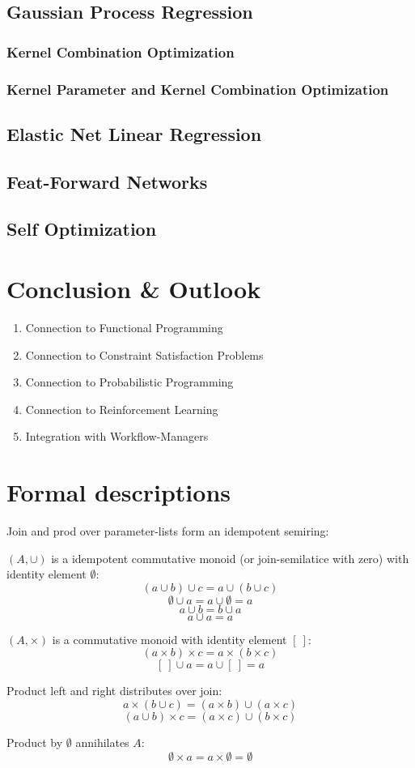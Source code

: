 \documentclass[english]{article}
\begin{document}
\subsection{Gaussian Process Regression}
\subsubsection{Kernel Combination Optimization}
\subsubsection{Kernel Parameter and Kernel Combination Optimization}
\subsection{Elastic Net Linear Regression}
\subsection{Feat-Forward Networks}
\subsection{Self Optimization}

\section{Conclusion \& Outlook}

\begin{enumerate}
  \item{Connection to Functional Programming}
  \item{Connection to Constraint Satisfaction Problems}
  \item{Connection to Probabilistic Programming}
  \item{Connection to Reinforcement Learning}
  \item{Integration with Workflow-Managers}
\end{enumerate}



\appendix



\section*{Formal descriptions}
Join and prod over parameter-lists form an idempotent semiring:

$(A, \cup)$ is a idempotent commutative monoid (or join-semilatice with zero) with identity element $\emptyset$:
$$(a \cup b) \cup c = a \cup (b \cup c)$$
$$\emptyset \cup a = a \cup \emptyset = a$$
$$a \cup b = b \cup a$$
$$a \cup a = a$$

$(A, \times)$ is a commutative monoid with identity element $[\ ]$:
$$(a \times b) \times c = a \times (b \times c)$$
$$[\ ] \cup a = a \cup [\ ] = a$$

Product left and right distributes over join:
$$a\times(b \cup c) = (a\times b) \cup (a\times c)$$
$$(a \cup b)\times c = (a\times c) \cup (b\times c)$$

Product by $\emptyset$ annihilates $A$:
$$\emptyset \times a = a \times \emptyset = \emptyset$$



\printbibliography
\end{document}
